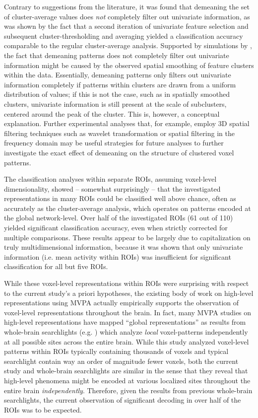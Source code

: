 \documentclass[jou,12pt,a4paper]{apa6}
\begin{document}
Contrary to suggestions from the literature, it was found that demeaning the set of cluster-average values does \emph{not} completely filter out univariate information, as was shown by the fact that a second iteration of univariate feature selection and subsequent cluster-thresholding and averaging yielded a classification accuracy comparable to the regular cluster-average analysis. Supported by simulations by , the fact that demeaning patterns does not completely filter out univariate information might be caused by the observed spatial smoothing of feature clusters within the data. Essentially, demeaning patterns only filters out univariate information completely if patterns within clusters are drawn from a uniform distribution of values; if this is not the case, such as in spatially smoothed clusters, univariate information is still present at the scale of subclusters, centered around the peak of the cluster. This is, however, a conceptual explanation. Further experimental analyses that, for example, employ 3D spatial filtering techniques such as wavelet transformation \cite{hackmack2012} or spatial filtering in the frequency domain \cite{swisher2010,brants2011} may be useful strategies for future analyses to further investigate the exact effect of demeaning on the structure of clustered voxel patterns. 

The classification analyses within separate ROIs, assuming voxel-level dimensionality, showed -- somewhat surprisingly -- that the investigated representations in many ROIs could be classified well above chance, often as accurately as the cluster-average analysis, which operates on patterns encoded at the global network-level. Over half of the investigated ROIs (61 out of 110) yielded significant classification accuracy, even when strictly corrected for multiple comparisons. These results appear to be largely due to capitalization on truly multidimensional information, because it was shown that only univariate information (i.e. mean activity within ROIs) was insufficient for significant classification for all but five ROIs. 

While these voxel-level representations within ROIs were surprising with respect to the current study's a priori hypotheses, the existing body of work on high-level representations using MVPA actually empirically supports the observation of voxel-level representations throughout the brain. In fact, many MVPA studies on high-level representations have mapped ``global representations'' as results from whole-brain searchlights (e.g. ) which analyze \emph{local} voxel-patterns independently at all possible sites across the entire brain. While this study analyzed voxel-level patterns within ROIs typically containing thousands of voxels and typical searchlight contain way an order of magnitude fewer voxels, both the current study and whole-brain searchlights are similar in the sense that they reveal that high-level phenomena might be encoded at various localized sites throughout the entire brain \emph{independently}. Therefore, given the results from previous whole-brain searchlights, the current observation of significant decoding in over half of the ROIs was to be expected.
\end{document}
